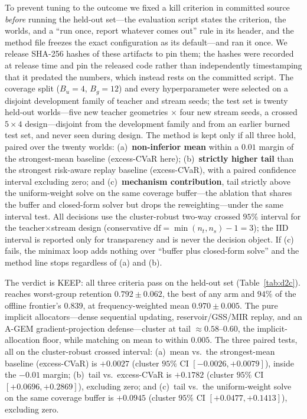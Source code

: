 To prevent tuning to the outcome we fixed a kill criterion in committed source
\emph{before} running the held-out set---the evaluation script states the criterion,
the worlds, and a ``run once, report whatever comes out'' rule in its header, and
the method file freezes the exact configuration as its default---and ran it once.
We release SHA-256 hashes of these artifacts to pin them; the hashes were recorded
at release time and pin the released code rather than independently timestamping
that it predated the numbers, which instead rests on the committed script. The coverage split ($B_u{=}4$,
$B_g{=}12$) and every hyperparameter were selected on a disjoint development
family of teacher and stream seeds; the test set is twenty held-out worlds---five
new teacher geometries $\times$ four new stream seeds, a crossed $5\times4$
design---disjoint from the development family and from an earlier burned test set,
and never seen during design. The method is kept only if all three hold, paired
over the twenty worlds: (a)~\textbf{non-inferior mean} within a $0.01$ margin of
the strongest-mean baseline (excess-CVaR here); (b)~\textbf{strictly higher tail}
than the strongest risk-aware replay baseline (excess-CVaR), with a paired
confidence interval excluding zero; and (c)~\textbf{mechanism contribution},
tail strictly above the uniform-weight solve on the same coverage buffer---the
ablation that shares the buffer and closed-form solver but drops the
reweighting---under the same interval test. All decisions use the cluster-robust
two-way crossed $95\%$ interval for the teacher$\times$stream design (conservative
$\mathrm{df}=\min(n_t,n_s)-1=3$); the IID interval is reported only for
transparency and is never the decision object. If (c) fails, the minimax loop
adds nothing over ``buffer plus closed-form solve'' and the method line stops
regardless of (a) and (b).

The verdict is KEEP: all three criteria pass on the held-out set
(Table~\ref{tab:d2c}). \method{} reaches worst-group retention
$0.792\pm0.062$, the best of any arm and $94\%$ of the offline frontier's
$0.839$, at frequency-weighted mean $0.970\pm0.005$. The pure implicit
allocators---dense sequential updating, reservoir/GSS/MIR replay, and an A-GEM
gradient-projection defense---cluster at tail $\approx0.58$--$0.60$, the
implicit-allocation floor, while matching \method{} on mean to within $0.005$.
The three paired tests, all on the cluster-robust crossed interval:
(a)~mean vs.\ the strongest-mean baseline (excess-CVaR) is $+0.0027$ (cluster
$95\%$ CI $[-0.0026,+0.0079]$), inside the $-0.01$ margin; (b)~tail vs.\
excess-CVaR is $+0.1782$ (cluster $95\%$ CI $[+0.0696,+0.2869]$), excluding
zero; and (c)~tail vs.\ the uniform-weight solve on the same coverage buffer is
$+0.0945$ (cluster $95\%$ CI $[+0.0477,+0.1413]$), excluding zero.

